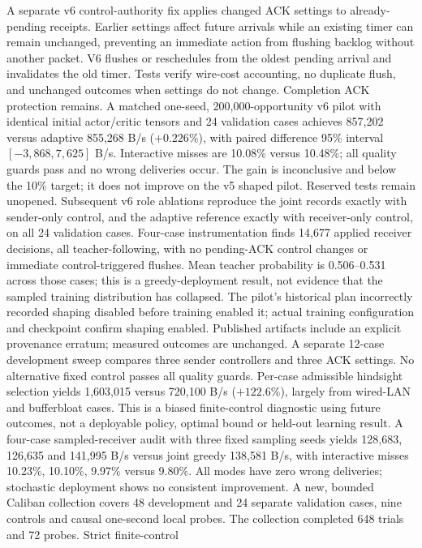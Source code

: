 \documentclass[11pt]{article}
\begin{document}
A separate v6 control-authority fix applies changed ACK settings to already-pending
receipts. Earlier settings affect future arrivals while an existing timer can
remain unchanged, preventing an immediate action from flushing backlog without
another packet. V6 flushes or reschedules from the oldest pending arrival and
invalidates the old timer. Tests verify wire-cost accounting, no duplicate flush,
and unchanged outcomes when settings do not change. Completion ACK protection
remains. A matched one-seed, 200,000-opportunity v6 pilot with identical initial
actor/critic tensors and 24 validation cases achieves 857,202 versus adaptive
855,268 B/s ($+0.226\%$), with paired difference 95\% interval
$[-3{,}868,7{,}625]$ B/s. Interactive misses are 10.08\% versus 10.48\%;
all quality guards pass and no wrong deliveries occur. The gain is inconclusive
and below the 10\% target; it does not improve on the v5 shaped pilot.
Reserved tests remain unopened. Subsequent v6 role ablations reproduce the joint
records exactly with sender-only control, and the adaptive reference exactly
with receiver-only control, on all 24 validation cases. Four-case instrumentation
finds 14,677 applied receiver decisions, all teacher-following, with no pending-ACK
control changes or immediate control-triggered flushes. Mean teacher probability
is 0.506--0.531 across those cases; this is a greedy-deployment result, not evidence
that the sampled training distribution has collapsed. The pilot's historical plan
incorrectly recorded shaping disabled before training enabled it; actual training
configuration and checkpoint confirm shaping enabled. Published artifacts include
an explicit provenance erratum; measured outcomes are unchanged.
A separate 12-case development sweep compares three sender controllers and
three ACK settings. No alternative fixed control passes all quality guards.
Per-case admissible hindsight selection yields 1,603,015 versus 720,100 B/s
($+122.6\%$), largely from wired-LAN and bufferbloat cases. This is a biased
finite-control diagnostic using future outcomes, not a deployable policy, optimal
bound or held-out learning result. A four-case sampled-receiver audit with three
fixed sampling seeds yields 128,683, 126,635 and 141,995 B/s versus joint greedy
138,581 B/s, with interactive misses 10.23\%, 10.10\%, 9.97\% versus 9.80\%.
All modes have zero wrong deliveries; stochastic deployment shows no consistent
improvement. A new, bounded Caliban collection covers 48 development and 24
separate validation cases, nine controls and causal one-second local probes.
The collection completed 648 trials and 72 probes. Strict finite-control
\end{document}
